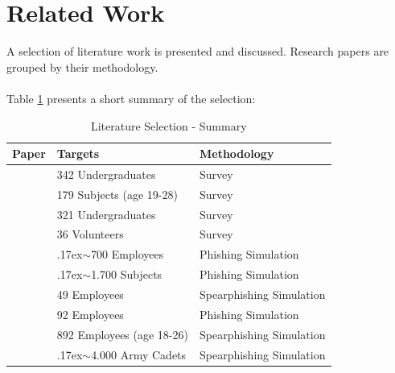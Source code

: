 \documentclass[a4paper]{article}
\newcommand{\mytilde}{\raise.17ex\hbox{$\scriptstyle\mathtt{\sim}$}}
\begin{document}
\newpage

\section{Related Work}

A selection of literature work is presented and discussed. Research papers are grouped by their methodology.
\\ \\
Table \ref{tb-selection-summary} presents a short summary of the selection:

\begingroup
\renewcommand{\arraystretch}{1.35}
\begin{table}[ht]
\begin{center}
    \begin{tabular}{ | c | l | l | }
    \hline
    \textbf{Paper} & \textbf{Targets} & \textbf{Methodology} \\ \hline
    
    \cite{lit-casestudy-students} & 342 Undergraduates & Survey \\ \hline
    \cite{lit-casestudy-assessing-soceng} & 179 Subjects (age 19-28) & Survey \\ \hline
    \cite{lit-casestudy-investigation-spearphish} & 321 Undergraduates & Survey \\ \hline
    \cite{lit-casestudy-ticket-solid} & 36 Volunteers & Survey \\ \hline
    
    \cite{lit-casestudy-assessing-resilience} & \mytilde700 Employees & Phishing Simulation \\ \hline
    \cite{lit-casestudy-organisational-learning} & \mytilde1.700 Subjects & Phishing Simulation \\ \hline
    \cite{lit-casestudy-revisiting-susceptibility} & 49 Employees & Spearphishing Simulation \\ \hline
    \cite{lit-casestudy-survey-virus} & 92 Employees & Phishing Simulation \\ \hline
    
    \cite{lit-casestudy-empirical-benefits} & 892 Employees (age 18-26) & Spearphishing Simulation \\ \hline
    \cite{lit-casestudy-carronade-academy} & \mytilde4.000 Army Cadets & Spearphishing Simulation \\ \hline
    
    \end{tabular}
\end{center}
\caption{Literature Selection - Summary}
\label{tb-selection-summary}
\end{table}
\endgroup
\end{document}
